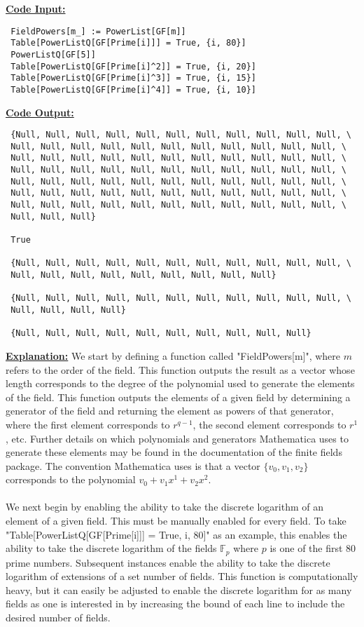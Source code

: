 \documentclass[11pt]{article}
\theoremstyle{plain}
\theoremstyle{definition}
\begin{document}
 \textbf{\underline{Code Input:}}
 \begin{verbatim}
 FieldPowers[m_] := PowerList[GF[m]]
 Table[PowerListQ[GF[Prime[i]]] = True, {i, 80}]
 PowerListQ[GF[5]]
 Table[PowerListQ[GF[Prime[i]^2]] = True, {i, 20}]
 Table[PowerListQ[GF[Prime[i]^3]] = True, {i, 15}]
 Table[PowerListQ[GF[Prime[i]^4]] = True, {i, 10}]
 \end{verbatim}
 \textbf{\underline{Code Output:}}
 \begin{verbatim}
 {Null, Null, Null, Null, Null, Null, Null, Null, Null, Null, Null, \
 Null, Null, Null, Null, Null, Null, Null, Null, Null, Null, Null, \
 Null, Null, Null, Null, Null, Null, Null, Null, Null, Null, Null, \
 Null, Null, Null, Null, Null, Null, Null, Null, Null, Null, Null, \
 Null, Null, Null, Null, Null, Null, Null, Null, Null, Null, Null, \
 Null, Null, Null, Null, Null, Null, Null, Null, Null, Null, Null, \
 Null, Null, Null, Null, Null, Null, Null, Null, Null, Null, Null, \
 Null, Null, Null}
 
 True
 
 {Null, Null, Null, Null, Null, Null, Null, Null, Null, Null, Null, \
 Null, Null, Null, Null, Null, Null, Null, Null, Null}
 
 {Null, Null, Null, Null, Null, Null, Null, Null, Null, Null, Null, \
 Null, Null, Null, Null}
 
 {Null, Null, Null, Null, Null, Null, Null, Null, Null, Null}
 \end{verbatim}
 \textbf{\underline{Explanation:}} We start by defining a function called "FieldPowers[m]", where $m$ refers to the order of the field. This function outputs the result as a vector whose length corresponds to the degree of the polynomial used to generate the elements of the field. This function outputs the elements of a given field by determining a generator of the field and returning the element as powers of that generator, where the first element corresponds to $r^{q-1}$, the second element corresponds to $r^1$, etc. Further details on which polynomials and generators Mathematica uses to generate these elements may be found in the documentation of the finite fields package. The convention Mathematica uses is that a vector $\{v_0, v_1, v_2\}$ corresponds to the polynomial $v_0 + v_1 x^1 + v_2 x^2$. \\
 \\
 We next begin by enabling the ability to take the discrete logarithm of an element of a given field. This must be manually enabled for every field. To take "Table[PowerListQ[GF[Prime[i]]] = True, {i, 80}]" as an example, this enables the ability to take the discrete logarithm of the fields $\mathbb{F}_p$ where $p$ is one of the first $80$ prime numbers. Subsequent instances enable the ability to take the discrete logarithm of extensions of a set number of fields. This function is computationally heavy, but it can easily be adjusted to enable the discrete logarithm for as many fields as one is interested in by increasing the bound of each line to include the desired number of fields.\\
\end{document}
